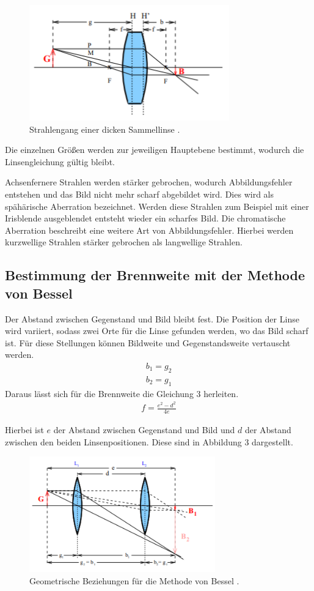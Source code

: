 \begin{figure}[H]
  \centering
  \includegraphics[height=5cm]{dickelinse.PNG}
  \caption{Strahlengang einer dicken Sammellinse \cite{sample}.}
  \label{fig:biegungbild1}
\end{figure}

Die einzelnen Größen werden zur jeweiligen Hauptebene bestimmt, wodurch die Linsengleichung
gültig bleibt.

Achsenfernere Strahlen werden stärker gebrochen, wodurch Abbildungsfehler entstehen und das Bild nicht mehr scharf
abgebildet wird. Dies wird als spähärische Aberration bezeichnet. Werden diese Strahlen zum Beispiel mit einer Irisblende
ausgeblendet entsteht wieder ein scharfes Bild.
Die chromatische Aberration beschreibt eine weitere Art von Abbildungsfehler. Hierbei werden kurzwellige Strahlen stärker
gebrochen als langwellige Strahlen.

\subsection{Bestimmung der Brennweite mit der Methode von Bessel}
Der Abstand zwischen Gegenstand und Bild bleibt fest. Die Position der Linse wird variiert,
sodass zwei Orte für die Linse gefunden werden, wo das Bild scharf ist. Für diese
Stellungen können Bildweite und Gegenstandsweite vertauscht werden.
\begin{align*}
  b_1 = g_2 \\
  b_2 = g_1
\end{align*}
Daraus lässt sich für die Brennweite  die Gleichung 3 herleiten.
\begin{align}
  f = \frac{e^2 - d^2}{4e}
\end{align}

Hierbei ist $e$ der Abstand zwischen Gegenstand und Bild und $d$ der Abstand zwischen den
beiden Linsenpositionen. Diese sind in Abbildung 3 dargestellt.

\begin{figure}[H]
  \centering
  \includegraphics[height=5cm]{bessel.PNG}
  \caption{Geometrische Beziehungen für die Methode von Bessel \cite{sample}.}
  \label{fig:biegungbild1}
\end{figure}

